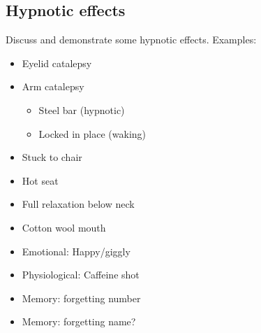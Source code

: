 \documentclass{dmistyle}
\begin{document}
\clearpage
\subsection{Hypnotic effects}

Discuss and demonstrate some hypnotic effects. Examples:

\begin{multicols}{3}
\begin{itemize}
	\item Eyelid catalepsy
	\item Arm catalepsy
		\begin{itemize}
			\item Steel bar (hypnotic)
			\item Locked in place (waking)
		\end{itemize}
	\item Stuck to chair
	\item Hot seat
	\item Full relaxation below neck
	\item Cotton wool mouth
	\item Emotional: Happy/giggly
	\item Physiological: Caffeine shot
	\item Memory: forgetting number
	\item Memory: forgetting name?
\end{itemize}
\end{multicols}
\end{document}
